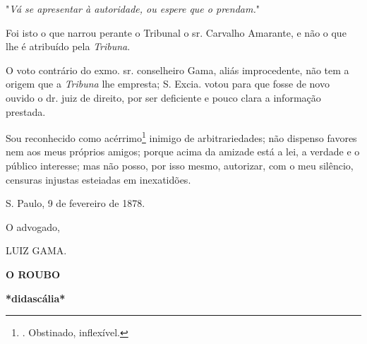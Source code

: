 "\emph{Vá se apresentar à autoridade, ou espere que o prendam.}"

Foi isto o que narrou perante o Tribunal o sr. Carvalho Amarante, e não
o que lhe é atribuído pela \emph{Tribuna}.

O voto contrário do exmo. sr. conselheiro Gama, aliás improcedente, não
tem a origem que a \emph{Tribuna} lhe empresta; S. Excia. votou para que
fosse de novo ouvido o dr. juiz de direito, por ser deficiente e pouco
clara a informação prestada.

Sou reconhecido como acérrimo\footnote{. Obstinado, inflexível.}
inimig\protect\hypertarget{Secao_Sem_Titulo-14}{}{}o de arbitrariedades;
não dispenso favores nem aos meus próprios amigos; porque acima da
amizade está a lei, a verdade e o público interesse; mas não posso, por
isso mesmo, autorizar, com o meu silêncio, censuras injustas esteiadas
em inexatidões.

S. Paulo, 9 de fevereiro de 1878.

O advogado,

LUIZ GAMA.

\protect\hypertarget{Secao_Sem_Titulo-15}{}{}\textbf{O ROUBO}

\textbf{*didascália*}


